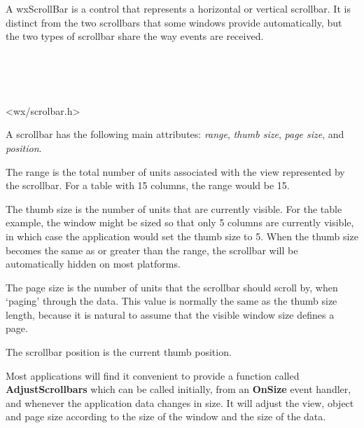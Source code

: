 \section{}\label{wxscrollbar}

A wxScrollBar is a control that represents a horizontal or
vertical scrollbar. It is distinct from the two scrollbars that some windows
provide automatically, but the two types of scrollbar share the way
events are received.


\\
\\
\\


<wx/scrolbar.h>


A scrollbar has the following main attributes: {\it range}, {\it thumb size}, {\it page size}, and {\it position}.

The range is the total number of units associated with the view represented by the scrollbar.
For a table with 15 columns, the range would be 15.

The thumb size is the number of units that are currently visible. For the table example, the window
might be sized so that only 5 columns are currently visible, in which case the application would
set the thumb size to 5. When the thumb size becomes the same as or greater than the range,
the scrollbar will be automatically hidden on most platforms.

The page size is the number of units that the scrollbar should scroll by, when `paging' through
the data. This value is normally the same as the thumb size length, because
it is natural to assume that the visible window size defines a page.

The scrollbar position is the current thumb position.

Most applications will find it convenient to provide a function called {\bf AdjustScrollbars} which can
be called initially, from an {\bf OnSize} event handler, and whenever the application data
changes in size. It will adjust the view, object and page size according
to the size of the window and the size of the data.


